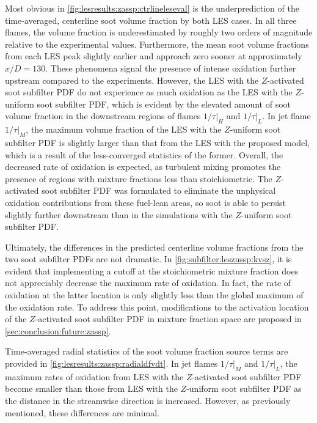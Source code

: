 Most obvious in \cref{fig:lesresults:zassp:ctrlineleseval} is the underprediction of the time-averaged, centerline soot volume fraction by both LES cases. In all three flames, the volume fraction is underestimated by roughly two orders of magnitude relative to the experimental values. Furthermore, the mean soot volume fractions from each LES peak slightly earlier and approach zero sooner at approximately $x/D = 130$. These phenomena signal the presence of intense oxidation further upstream compared to the experiments. However, the LES with the $Z$-activated soot subfilter PDF do not experience as much oxidation as the LES with the $Z$-uniform soot subfilter PDF, which is evident by the elevated amount of soot volume fraction in the downstream regions of flames $1/\tau|_H$ and $1/\tau|_L$. In jet flame $1/\tau|_M$, the maximum volume fraction of the LES with the $Z$-uniform soot subfilter PDF is slightly larger than that from the LES with the proposed model, which is a result of the less-converged statistics of the former. Overall, the decreased rate of oxidation is expected, as turbulent mixing promotes the presence of regions with mixture fractions less than stoichiometric. The $Z$-activated soot subfilter PDF was formulated to eliminate the unphysical oxidation contributions from these fuel-lean areas, so soot is able to persist slightly further downstream than in the simulations with the $Z$-uniform soot subfilter PDF.

Ultimately, the differences in the predicted centerline volume fractions from the two soot subfilter PDFs are not dramatic. In \cref{fig:subfilter:leszussp:kvsz}, it is evident that implementing a cutoff at the stoichiometric mixture fraction does not appreciably decrease the maximum rate of oxidation. In fact, the rate of oxidation at the latter location is only slightly less than the global maximum of the oxidation rate. To address this point, modifications to the activation location of the $Z$-activated soot subfilter PDF in mixture fraction space are proposed in \cref{sec:conclusion:future:zassp}.

Time-averaged radial statistics of the soot volume fraction source terms are provided in \cref{fig:lesresults:zassp:radialdfvdt}. In jet flames $1/\tau|_M$ and $1/\tau|_L$, the maximum rates of oxidation from LES with the $Z$-activated soot subfilter PDF become smaller than those from LES with the $Z$-uniform soot subfilter PDF as the distance in the streamwise direction is increased. However, as previously mentioned, these differences are minimal. %

